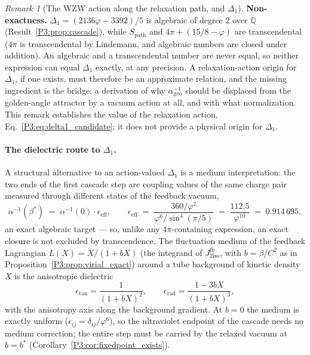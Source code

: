 \documentclass[11pt,a4paper]{article}
\theoremstyle{definition}
\theoremstyle{remark}
\newtheorem{remark}[theorem]{Remark}
\newcommand{\vp}{\varphi}
\newcommand{\bst}{\beta^{*}}
\newcommand{\Jfb}{J_{2\mathrm{iso}}^{\mathrm{fb}}}
\newcommand{\aInv}{\alpha^{-1}}
\begin{document}
\begin{remark}[The WZW action along the relaxation path, and $\Delta_1$]
\textbf{Non-exactness.} $\Delta_1 = (2136\vp-3392)/5$ is algebraic of
degree $2$ over $\mathbb{Q}$ (Result~\ref{P3:prop:cascade}), while
$S_{\mathrm{path}}$ and $4\pi+(15/8-\vp)$ are transcendental ($4\pi$ is
transcendental by Lindemann, and algebraic numbers are closed under
addition). An algebraic and a transcendental number are never equal, so
neither expression can equal $\Delta_1$ exactly, at any precision. A
relaxation-action origin for $\Delta_1$, if one exists, must therefore
be an approximate relation, and the missing ingredient is the bridge:
a derivation of why $\aInv_{\mathrm{geo}}$ should be displaced from the
golden-angle attractor by a vacuum action at all, and with what
normalization. This remark establishes the value of the relaxation
action, Eq.~\eqref{P3:eq:delta1_candidate}; it does not provide a
physical origin for $\Delta_1$.
\end{remark}

\paragraph{The dielectric route to $\Delta_1$.}
A structural alternative to an action-valued $\Delta_1$ is a medium
interpretation: the two ends of the first cascade step are coupling
values of the same charge pair measured through different states of the
feedback vacuum,
\[
  \aInv(\bst) \;=\; \aInv(0)\cdot\epsilon_{\mathrm{eff}},
  \qquad
  \epsilon_{\mathrm{eff}}
  \;=\; \frac{360/\vp^2}{\vp^6/\sin^4(\pi/5)}
  \;=\; \frac{112.5}{\vp^{10}}
  \;=\; 0.914\,695 ,
\]
an exact algebraic target --- so, unlike any $4\pi$-containing
expression, an exact closure is not excluded by transcendence. The
fluctuation medium of the feedback Lagrangian $L(X) = X/(1+bX)$ (the
integrand of $\Jfb$, with $b = \beta/C^2$ as in
Proposition~\ref{P3:prop:virial_exact}) around a tube background of
kinetic density $X$ is the anisotropic dielectric
\[
  \epsilon_{\tan} = \frac{1}{(1+bX)^2},
  \qquad
  \epsilon_{\mathrm{rad}} = \frac{1-3bX}{(1+bX)^3},
\]
with the anisotropy axis along the background gradient. At $b=0$ the
medium is exactly uniform ($\epsilon_{ij}=\delta_{ij}/\vp^6$), so the
ultraviolet endpoint of the cascade needs no medium correction; the
entire step must be carried by the relaxed vacuum at $b=b^*$
(Corollary~\ref{P3:cor:fixedpoint_exists}).
\end{document}
